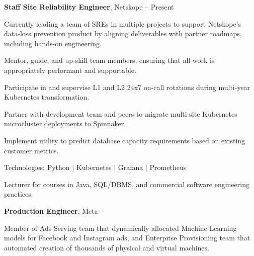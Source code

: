 \documentclass[MMMMyyyy,nonstopmode]{simpleresumecv_stacked}
\newcommand{\tech}[1]{\Gap\textrm{Technologies:} #1}
\newif\ifLOCATION
\begin{document}
\begin{Body}
\Entry
\textbf{Staff Site Reliability Engineer}, Netskope
\hfill
 -- Present

\Gap
\begin{Detail}

Currently leading a team of SREs in multiple projects to support Netskope's data-loss prevention product by aligning deliverables with partner roadmaps, including hands-on engineering.

\Gap

\BulletItem
Mentor, guide, and up-skill team members, ensuring that all work is appropriately performant and supportable.

\BulletItem
Participate in and supervise L1 and L2 24x7 on-call rotations during multi-year Kubernetes transformation.


\BulletItem
Partner with development team  and peers to migrate multi-site Kubernetes microcluster deployments to Spinnaker.

\BulletItem
Implement utility to predict database capacity requirements based on existing customer metrics.

\end{Detail}

\tech{Python $|$ Kubernetes $|$ Grafana $|$ Prometheus}

\BigGap

\iffalse %
\Entry
\textbf{Adjunct Professor}, Rochester Institute of Technology \textit{(Part-Time)}
\hfill
\DatestampY{2017} --
Present

\ifLOCATION
\hfill 
Rochester, New York
\fi

\Gap
\begin{Detail}
Lecturer for courses in Java, SQL/DBMS, and commercial software engineering practices.
\end{Detail}

\BigGap
\fi

\Entry
\textbf{Production Engineer}, Meta
\hfill
{} -- 


\Gap
\begin{Detail}
Member of Ads Serving team that dynamically allocated Machine Learning models for Facebook and Instagram ads, and Enterprise Provisioning team that automated creation of thousands of physical and virtual machines.


\end{Detail}
\end{Body}
\end{document}
